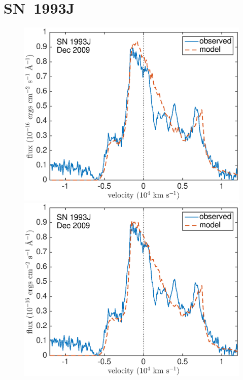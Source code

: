 \section{SN~1993J}
\begin{figure}
\centering
\includegraphics[scale=0.4,clip=true, trim=20 0 40 20]{chapters/chapter6/figs/93J/smooth/OIII}
\includegraphics[scale=0.4,clip=true, trim=20 0 40 20]{chapters/chapter6/figs/93J/smooth/OIII_amC}


\end{figure}
